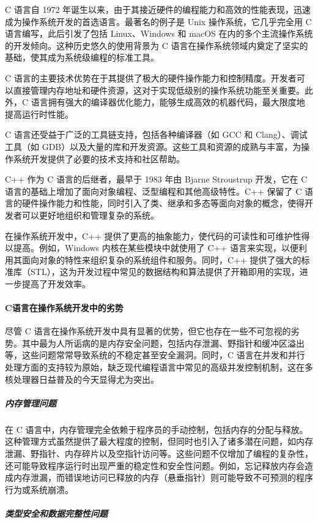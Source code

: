 C 语言自 1972 年诞生以来，由于其接近硬件的编程能力和高效的性能表现，迅速成为操作系统开发的首选语言。最著名的例子是 Unix 操作系统，它几乎完全用 C 语言编写，此后引发了包括 Linux、Windows 和 macOS 在内的多个主流操作系统的开发倾向。这种历史悠久的使用背景为 C 语言在操作系统领域内奠定了坚实的基础，使其成为系统级编程的标准工具。

C 语言的主要技术优势在于其提供了极大的硬件操作能力和控制精度。开发者可以直接管理内存地址和硬件资源，这对于实现低级别的操作系统功能至关重要。此外，C 语言拥有强大的编译器优化能力，能够生成高效的机器代码，最大限度地提高运行时性能。

C 语言还受益于广泛的工具链支持，包括各种编译器（如 GCC 和 Clang）、调试工具（如 GDB）以及大量的库和开发资源。这些工具和资源的成熟与丰富，为操作系统开发提供了必要的技术支持和社区帮助。

C++ 作为 C 语言的后继者，最早于 1983 年由 Bjarne Stroustrup 开发，它在 C 语言的基础上增加了面向对象编程、泛型编程和其他高级特性。C++ 保留了 C 语言的硬件操作能力和性能，同时引入了类、继承和多态等面向对象的概念，使得开发者可以更好地组织和管理复杂的系统。

在操作系统开发中，C++ 提供了更高的抽象能力，使代码的可读性和可维护性得以提高。例如，Windows 内核在某些模块中就使用了 C++ 语言来实现，以便利用其面向对象的特性来组织复杂的系统组件和服务。同时，C++ 提供了强大的标准库（STL），这为开发过程中常见的数据结构和算法提供了开箱即用的实现，进一步提高了开发效率。

\paragraph{C语言在操作系统开发中的劣势}

尽管 C 语言在操作系统开发中具有显著的优势，但它也存在一些不可忽视的劣势。其中最为人所诟病的是内存安全问题，包括内存泄漏、野指针和缓冲区溢出等，这些问题常常导致系统的不稳定甚至安全漏洞。同时，C 语言在并发和并行处理方面的支持较为原始，缺乏现代编程语言中常见的高级并发控制机制，这在多核处理器日益普及的今天显得尤为突出。

\subparagraph{内存管理问题}

在 C 语言中，内存管理完全依赖于程序员的手动控制，包括内存的分配与释放。这种管理方式虽然提供了最大程度的控制，但同时也引入了诸多潜在问题，如内存泄漏、野指针、内存碎片以及空指针访问等。这些问题不仅增加了编程的复杂性，还可能导致程序运行时出现严重的稳定性和安全性问题。例如，忘记释放内存会造成内存泄漏，而错误地访问已释放的内存（悬垂指针）则可能导致不可预测的程序行为或系统崩溃。

\subparagraph{类型安全和数据完整性问题}

